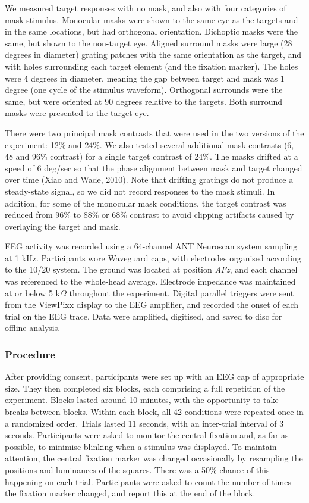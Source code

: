 \documentclass[]{article}
\begin{document}
We measured target responses with no mask, and also with four categories of mask stimulus. Monocular masks were shown to the same eye as the targets and in the same locations, but had orthogonal orientation. Dichoptic masks were the same, but shown to the non-target eye. Aligned surround masks were large (28 degrees in diameter) grating patches with the same orientation as the target, and with holes surrounding each target element (and the fixation marker). The holes were 4 degrees in diameter, meaning the gap between target and mask was 1 degree (one cycle of the stimulus waveform). Orthogonal surrounds were the same, but were oriented at 90 degrees relative to the targets. Both surround masks were presented to the target eye.

There were two principal mask contrasts that were used in the two versions of the experiment: 12\% and 24\%. We also tested several additional mask contrasts (6, 48 and 96\% contrast) for a single target contrast of 24\%. The masks drifted at a speed of 6 deg/sec so that the phase alignment between mask and target changed over time (Xiao and Wade, 2010). Note that drifting gratings do not produce a steady-state signal, so we did not record responses to the mask stimuli. In addition, for some of the monocular mask conditions, the target contrast was reduced from 96\% to 88\% or 68\% contrast to avoid clipping artifacts caused by overlaying the target and mask.

EEG activity was recorded using a 64-channel ANT Neuroscan system sampling at 1 kHz. Participants wore Waveguard caps, with electrodes organised according to the 10/20 system. The ground was located at position \emph{AFz}, and each channel was referenced to the whole-head average. Electrode impedance was maintained at or below 5 k\(\Omega\) throughout the experiment. Digital parallel triggers were sent from the ViewPixx display to the EEG amplifier, and recorded the onset of each trial on the EEG trace. Data were amplified, digitised, and saved to disc for offline analysis.

\hypertarget{procedure}{%
\subsubsection{Procedure}\label{procedure}}

After providing consent, participants were set up with an EEG cap of appropriate size. They then completed six blocks, each comprising a full repetition of the experiment. Blocks lasted around 10 minutes, with the opportunity to take breaks between blocks. Within each block, all 42 conditions were repeated once in a randomized order. Trials lasted 11 seconds, with an inter-trial interval of 3 seconds. Participants were asked to monitor the central fixation and, as far as possible, to minimise blinking when a stimulus was displayed. To maintain attention, the central fixation marker was changed occasionally by resampling the positions and luminances of the squares. There was a 50\% chance of this happening on each trial. Participants were asked to count the number of times the fixation marker changed, and report this at the end of the block.
\end{document}
